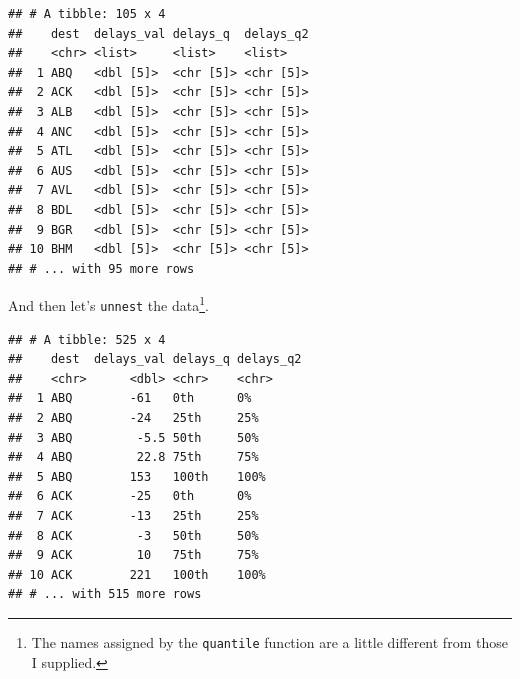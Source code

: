 \documentclass[]{book}
\newenvironment{Shaded}{\begin{snugshade}}{\end{snugshade}}
\newcommand{\DataTypeTok}[1]{\textcolor[rgb]{0.13,0.29,0.53}{#1}}
\newcommand{\KeywordTok}[1]{\textcolor[rgb]{0.13,0.29,0.53}{\textbf{#1}}}
\newcommand{\NormalTok}[1]{#1}
\newcommand{\OperatorTok}[1]{\textcolor[rgb]{0.81,0.36,0.00}{\textbf{#1}}}
\newcommand{\OtherTok}[1]{\textcolor[rgb]{0.56,0.35,0.01}{#1}}
\newcommand{\StringTok}[1]{\textcolor[rgb]{0.31,0.60,0.02}{#1}}
\let\rmarkdownfootnote\footnote%
\def\footnote{\protect\rmarkdownfootnote}
\theoremstyle{definition}
\theoremstyle{definition}
\theoremstyle{definition}
\theoremstyle{remark}
\begin{document}
\begin{Shaded}
\end{Shaded}

\begin{verbatim}
## # A tibble: 105 x 4
##    dest  delays_val delays_q  delays_q2
##    <chr> <list>     <list>    <list>   
##  1 ABQ   <dbl [5]>  <chr [5]> <chr [5]>
##  2 ACK   <dbl [5]>  <chr [5]> <chr [5]>
##  3 ALB   <dbl [5]>  <chr [5]> <chr [5]>
##  4 ANC   <dbl [5]>  <chr [5]> <chr [5]>
##  5 ATL   <dbl [5]>  <chr [5]> <chr [5]>
##  6 AUS   <dbl [5]>  <chr [5]> <chr [5]>
##  7 AVL   <dbl [5]>  <chr [5]> <chr [5]>
##  8 BDL   <dbl [5]>  <chr [5]> <chr [5]>
##  9 BGR   <dbl [5]>  <chr [5]> <chr [5]>
## 10 BHM   <dbl [5]>  <chr [5]> <chr [5]>
## # ... with 95 more rows
\end{verbatim}

And then let's \texttt{unnest} the data\footnote{The names assigned by
  the \texttt{quantile} function are a little different from those I
  supplied.}.

\begin{Shaded}
\end{Shaded}

\begin{verbatim}
## # A tibble: 525 x 4
##    dest  delays_val delays_q delays_q2
##    <chr>      <dbl> <chr>    <chr>    
##  1 ABQ        -61   0th      0%       
##  2 ABQ        -24   25th     25%      
##  3 ABQ         -5.5 50th     50%      
##  4 ABQ         22.8 75th     75%      
##  5 ABQ        153   100th    100%     
##  6 ACK        -25   0th      0%       
##  7 ACK        -13   25th     25%      
##  8 ACK         -3   50th     50%      
##  9 ACK         10   75th     75%      
## 10 ACK        221   100th    100%     
## # ... with 515 more rows
\end{verbatim}
\end{document}
